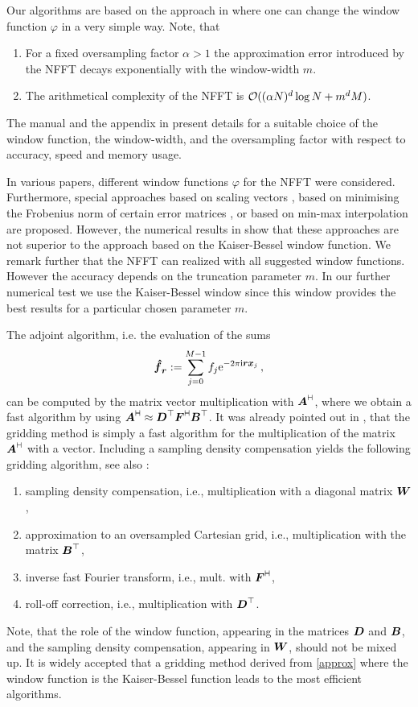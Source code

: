 \documentclass[journal]{IEEEtran}
\def\ti{\mbox{\scriptsize{\rm i}}}
\newcommand{\eim}[1]{{\rm e}^{-2\pi{\ti} #1}}
\newcommand{\zb}[1]{\mbox{\boldmath{${#1}$}}}
\newcommand{\zbs}[1]{\mbox{\boldmath\scriptsize{${#1}$}}}
\newcommand{\adj}{{\vdash \hspace*{-1.72mm} \dashv}}
\numberwithin{equation}{section}
\numberwithin{table}{section}
\numberwithin{figure}{section}
\begin{document}
Our algorithms are based on the approach in \cite{postta01} where one can change 
the window function $\varphi$ in a very simple way. Note, that
\begin{enumerate}
\item For a fixed oversampling factor $\alpha >1$ the approximation error introduced by the NFFT
decays exponentially with the window-width $m$.
\item The arithmetical complexity of the NFFT is ${\cal O} ((\alpha N)^d\log N+m^d M)$. 
\end{enumerate}
The manual \cite{kupo04b} and the appendix in \cite{post02} present details
for a suitable choice of the window function, the window-width, and the
oversampling factor with respect to accuracy, speed and memory usage.

In various papers, different window functions $\varphi$ for the NFFT
were considered. 
Furthermore, special approaches based on scaling vectors
\cite{NgLi99}, based on minimising the Frobenius norm of certain error
matrices \cite{st01}, or based on min-max interpolation \cite{fesu02} are
proposed. However, the numerical results in \cite{four, st01, fesu02} show that
these approaches are not superior to the approach based on the Kaiser-Bessel
window function.
We remark further that the NFFT  can realized
with all suggested window functions. However the accuracy depends on
the truncation parameter $m$. In our further numerical test we use the
Kaiser-Bessel window since this window provides the best results for a
particular chosen parameter $m$.

The adjoint algorithm, i.e. the evaluation of the sums
\begin{equation} \label{trigPolyT}
\zb {\hat f}_{\zbs r} := \sum_{j=0}^{M-1} f_j \eim{\zbs r \zbs x_j}\,,
\end{equation}
can be computed by the matrix vector multiplication with $\zb A^{\adj}$, where
we obtain a fast algorithm by using $\zb A^{\adj} \approx \zb D^{\top}
\zb F^{\adj} \zb B^{\top}$.
It was already pointed out in \cite{postta01,SaBeCo01}, that the gridding
method is simply a fast algorithm for the multiplication of the matrix
$\zb A^{\adj}$ with a vector.
Including a sampling density compensation yields the following gridding
algorithm, see also \cite{scsc, Ja, Pe}:
\begin{enumerate}
\item sampling density compensation, i.e., multiplication with a diagonal
  matrix $\zb W$,
\item approximation to an oversampled Cartesian grid, i.e., multiplication
  with the matrix $\zb B^{\top}$,
\item inverse fast Fourier transform, i.e., mult. with $\zb F^{\adj}$,
\item roll-off correction, i.e., multiplication with $\zb D^{\top}$.
\end{enumerate}
Note, that the role of the window function, appearing in the matrices $\zb D$
and $\zb B$, and the sampling density compensation, appearing in $\zb W$,
should not be mixed up.
It is widely accepted that a gridding method derived from
\eqref{approx} where the window function is the Kaiser-Bessel function
leads to the most efficient algorithms. 
\end{document}
